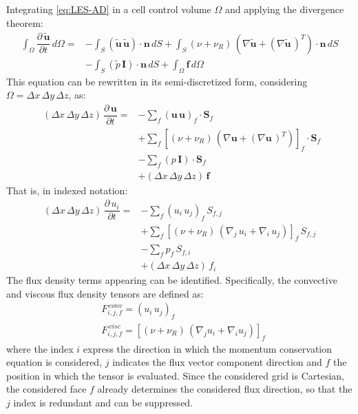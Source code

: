 \documentclass[12pt, a4paper, twoside, openright]{book}
\begin{document}
Integrating \eqref{eq:LES-AD} in a cell control volume $\Omega$ and applying the divergence theorem:
\begin{equation}
	\begin{split}
		\int_{\Omega} \dfrac{\partial \, \bm{\widetilde{u}}}{\partial t} \, d \Omega =
		&- \int_S \left( \bm{\widetilde{u}} \, \bm{\widetilde{u}} \right) \cdot \bm{n} \, dS
		+ \int_S (\nu + \nu_{R}) \, \left(\nabla \bm{\widetilde{u}} + \left( \nabla \bm{\widetilde{u}} \, \right)^T \right) \cdot \bm{n} \, dS \\
		&- \int_S \left( \widetilde{p} \, \bm{I} \right) \cdot \bm{n} \, dS
		+ \int_\Omega \bm{f} \, d \Omega
	\end{split}
\end{equation}
This equation can be rewritten in its semi-discretized form, considering $\Omega = \Delta x \, \Delta y \, \Delta z$, as:
\begin{equation}
	\begin{split}
		\phantom{,}
		\left(\Delta x \, \Delta y \, \Delta z \right) \, \dfrac{\partial \, \bm{u}}{\partial t} =
		&- \sum_f \left( \bm{u} \, \bm{u} \right)_f \cdot \bm{S}_f \\
		&+ \sum_f \left[ (\nu + \nu_{R}) \, \left(\nabla \bm{u} + \left( \nabla \bm{u} \, \right)^T \right) \right]_f \cdot \bm{S}_f \\
		&- \sum_f \left( p \, \bm{I} \right) \cdot \bm{S}_f \\
		&+ \left(\Delta x \, \Delta y \, \Delta z \right) \, \bm{f}
	\end{split}
\end{equation}
That is, in indexed notation:
\begin{equation}
	\label{eq:discretized-mom-indexed}
\begin{split}
    (\Delta x \, \Delta y \, \Delta z) \, \dfrac{\partial \, u_i}{\partial t} =
    &- \sum_f (u_i \, u_j)_f \, S_{f,j} \\
    & + \sum_f \left[ (\nu + \nu_{R}) \, \left( \nabla_j \, u_i + \nabla_i \, u_j \right) \right]_f \, S_{f,j} \\
    & - \sum_f p_f \, S_{f,i} \\
    & + (\Delta x \, \Delta y \, \Delta z) \, f_i
\end{split}
\end{equation}
The flux density terms appearing can be identified. Specifically, the convective and viscous flux density tensors are defined as:
\begin{equation}
	\begin{split}
    &F_{i, j, f}^{\, conv} = (u_i \, u_j)_f \\
    &F_{i, j, f}^{\, visc} = \left[ (\nu + \nu_{R}) \, \left( \nabla_j u_i + \nabla_i u_j \right) \right]_f
\end{split}
\label{eq:conv-visc-fluxes}
\end{equation}
where the index $i$ express the direction in which the momentum conservation equation is considered, $j$ indicates the flux vector component direction and $f$ the position in which the tensor is evaluated. Since the considered grid is Cartesian, the considered face $f$ already determines the considered flux direction, so that the $j$ index is redundant and can be suppressed.
\end{document}
